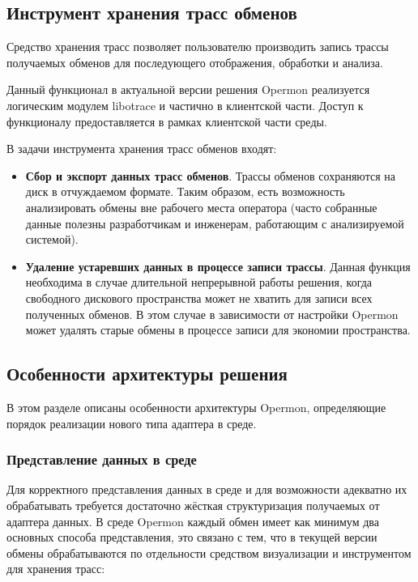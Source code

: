 \subsection{Инструмент хранения трасс обменов}

Средство хранения трасс позволяет пользователю производить запись трассы получаемых обменов для последующего отображения, обработки и анализа. 

Данный функционал в актуальной версии решения Opermon реализуется логическим модулем libotrace и частично в клиентской части. Доступ к функционалу предоставляется в рамках клиентской части среды.

В задачи инструмента хранения трасс обменов входят:

\begin{itemize}
 \item \textbf{Сбор и экспорт данных трасс обменов}. Трассы обменов сохраняются на диск в отчуждаемом формате. Таким образом, есть возможность анализировать обмены вне рабочего места оператора (часто собранные данные полезны разработчикам и инженерам, работающим с анализируемой системой).
 \item \textbf{Удаление устаревших данных в процессе записи трассы}. Данная функция необходима в случае длительной непрерывной работы решения, когда свободного дискового пространства может не хватить для записи всех полученных обменов. В этом случае в зависимости от настройки Opermon может удалять старые обмены в процессе записи для экономии пространства.
\end{itemize}

\subsection{Особенности архитектуры решения}

В этом разделе описаны особенности архитектуры Opermon, определяющие порядок реализации нового типа адаптера в среде.

\subsubsection{Представление данных в среде}

Для корректного представления данных в среде и для возможности адекватно их обрабатывать требуется достаточно жёсткая структуризация получаемых от адаптера данных. В среде Opermon каждый обмен имеет как минимум два основных способа представления, это связано с тем, что в текущей версии обмены обрабатываются по отдельности средством визуализации и инструментом для хранения трасс:

